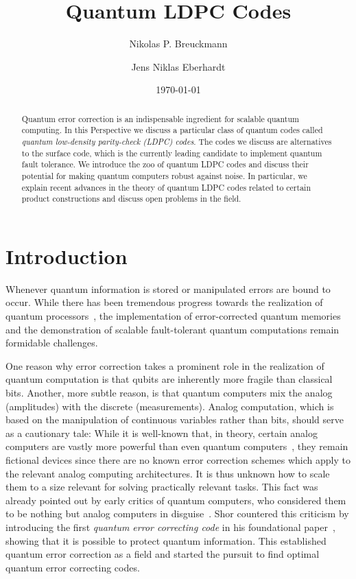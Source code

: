\documentclass[amsmath, amssymb, floatfix, reprint, twocolumn, notitlepage, 10pt]{revtex4-1}
\newcommand{\changetwo}{}
\begin{document}
\title{Quantum LDPC Codes}
\author{Nikolas P. Breuckmann}
\author{Jens Niklas Eberhardt}
\date{\today}


\begin{abstract}
Quantum error correction is an indispensable ingredient for scalable quantum computing.
In this Perspective we discuss a particular class of quantum codes called \emph{quantum low-density parity-check (LDPC) codes}.
The codes we discuss are alternatives to the surface code, which is the currently leading candidate to implement quantum fault tolerance.
We introduce the zoo of quantum LDPC codes and discuss their potential for making quantum computers robust against noise.
In particular, we explain recent advances in the theory of quantum LDPC codes related to certain product constructions and discuss open problems in the field.
\end{abstract}

\maketitle

\section{Introduction}
Whenever quantum information is stored or manipulated errors are bound to occur.
While there has been tremendous progress towards the realization of quantum processors~\cite{arute2019quantum,zhong2020quantum,jurcevic2021demonstration}, the implementation of error-corrected quantum memories and the demonstration of scalable fault-tolerant quantum computations remain formidable challenges.

One reason why error correction takes a prominent role in the realization of quantum computation is that qubits are inherently more fragile than classical bits.
Another, more subtle reason, is that quantum computers mix the analog (amplitudes) with the discrete (measurements).
Analog computation, which is based on the manipulation of continuous variables rather  than bits, should serve as a cautionary tale:
While it is well-known that, in theory, certain analog computers are vastly more powerful than even quantum computers~\cite{schonhage1979power}, they remain fictional devices since {\changetwo there are no known error correction schemes which apply to the relevant analog computing architectures}.
It is  {\changetwo thus unknown how} to scale them to a size relevant for solving practically relevant tasks.
This fact was already pointed out by early critics of quantum computers, who considered them to be nothing but analog computers in disguise~\cite{landauer1996physical,aaronson2013quantum}.
Shor countered this criticism by introducing the first \emph{quantum error correcting code} in his foundational paper~\cite{shor1995scheme}, showing that it is possible to protect quantum information.
This established quantum error correction as a field and started the pursuit to find optimal quantum error correcting codes.
\end{document}
